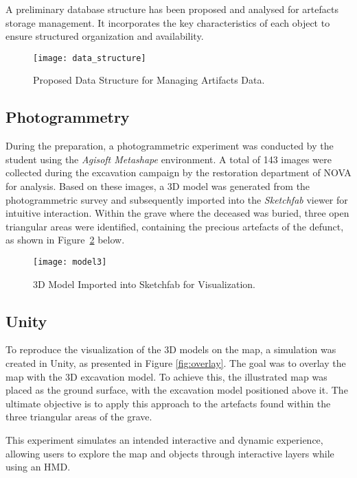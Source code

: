 A preliminary database structure has been proposed and analysed for artefacts storage management.  
It incorporates the key characteristics of each object to ensure structured organization and availability.

\begin{figure}[h!]
    \centering
    \texttt{[image: data\_structure]}
    \caption{Proposed Data Structure for Managing Artifacts Data.}
    \label{fig:data_strucutre}
\end{figure}
\FloatBarrier

\subsection{Photogrammetry}
\label{sec:photogrammetry_previous} 

During the preparation, a photogrammetric experiment was conducted by the student using the \textit{Agisoft Metashape} environment. A total of 143 images were collected during the excavation campaign by the restoration department of NOVA for analysis. 
Based on these images, a \gls{3D} model was generated from the photogrammetric survey and subsequently imported into the \textit{Sketchfab} viewer for intuitive interaction.
Within the grave where the deceased was buried, three open triangular areas were identified, containing the precious artefacts of the defunct, as shown in Figure~\ref{fig:model3} below.

\begin{figure}[h!]
    \centering
    \texttt{[image: model3]}
    \caption{\gls{3D} Model Imported into Sketchfab for Visualization.}
    \label{fig:model3}
\end{figure}
\FloatBarrier

\subsection{Unity}
\label{sec:unity} 

To reproduce the visualization of the \gls{3D} models on the map, a simulation was created in Unity, as presented in Figure \ref{fig:overlay}. The goal was to overlay the map with the \gls{3D} excavation model.
To achieve this, the illustrated map was placed as the ground surface, with the excavation model positioned above it. The ultimate objective is to apply this approach to the artefacts found within the three triangular areas of the grave.

This experiment simulates an intended interactive and dynamic experience, allowing users to explore the map and objects through interactive layers while using an \gls{HMD}.


